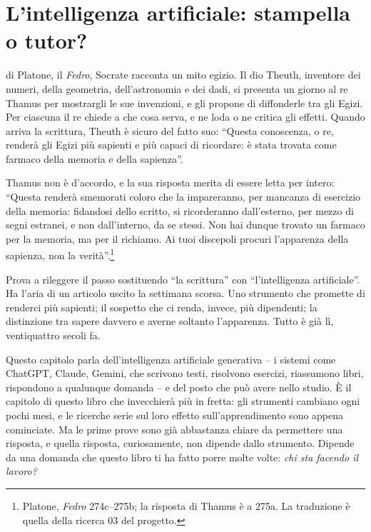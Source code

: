 \chapter{L'intelligenza artificiale: stampella o tutor?}
\label{cap:ia}


 di Platone, il \emph{Fedro}, Socrate
racconta un mito egizio. Il dio Theuth, inventore dei numeri, della
geometria, dell'astronomia e dei dadi, si presenta un giorno al re
Thamus per mostrargli le sue invenzioni, e gli propone di diffonderle
tra gli Egizi. Per ciascuna il re chiede a che cosa serva, e ne loda o
ne critica gli effetti. Quando arriva la scrittura, Theuth è sicuro del
fatto suo: \enquote{Questa conoscenza, o re, renderà gli Egizi più
sapienti e più capaci di ricordare: è stata trovata come farmaco della
memoria e della sapienza}.

Thamus non è d'accordo, e la sua risposta merita di essere letta per
intero: \enquote{Questa renderà smemorati coloro che la impareranno,
per mancanza di esercizio della memoria: fidandosi dello scritto, si
ricorderanno dall'esterno, per mezzo di segni estranei, e non
dall'interno, da se stessi. Non hai dunque trovato un farmaco per la
memoria, ma per il richiamo. Ai tuoi discepoli procuri l'apparenza della
sapienza, non la verità}.\footnote{Platone, \emph{Fedro} 274c--275b; la
risposta di Thamus è a 275a. La traduzione è quella della ricerca 03
del progetto.}

Prova a rileggere il passo sostituendo \enquote{la scrittura} con
\enquote{l'intelligenza artificiale}. Ha l'aria di un articolo uscito
la settimana scorsa. Uno strumento che promette di renderci più
sapienti; il sospetto che ci renda, invece, più dipendenti; la
distinzione tra sapere davvero e averne soltanto l'apparenza. Tutto è
già lì, ventiquattro secoli fa.

Questo capitolo parla dell'intelligenza artificiale generativa -- i
sistemi come ChatGPT, Claude, Gemini, che scrivono testi, risolvono
esercizi, riassumono libri, rispondono a qualunque domanda -- e del
posto che può avere nello studio. È il capitolo di questo libro che
invecchierà più in fretta: gli strumenti cambiano ogni pochi mesi, e le
ricerche serie sul loro effetto sull'apprendimento sono appena
cominciate. Ma le prime prove sono già abbastanza chiare da permettere
una risposta, e quella risposta, curiosamente, non dipende dallo
strumento. Dipende da una domanda che questo libro ti ha fatto porre
molte volte: \emph{chi sta facendo il lavoro?}

